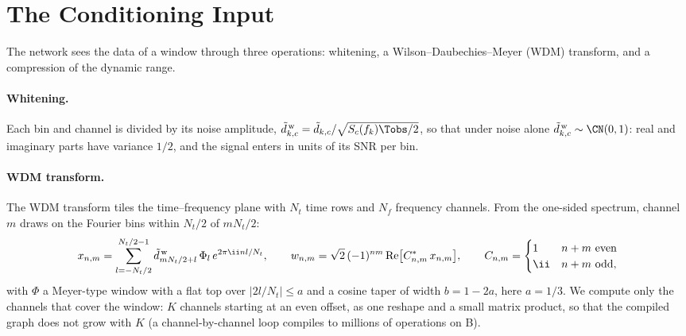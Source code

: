 \section{The Conditioning Input}
\label{app:conditioning}

The network sees the data of a window through three operations: whitening, a
Wilson--Daubechies--Meyer (WDM) transform, and a compression of the dynamic range.

\paragraph{Whitening.}
Each bin and channel is divided by its noise amplitude,
$\tilde d^{\,\rm w}_{k,c} = \tilde d_{k,c}/\sqrt{S_c(f_k)\Tobs/2}$, so that under noise alone
$\tilde d^{\,\rm w}_{k,c}\sim\CN(0,1)$: real and imaginary parts have variance $1/2$, and the
signal enters in units of its SNR per bin.

\paragraph{WDM transform.}
The WDM transform \citep{necula2012transient,cornish2020time,vajpeyi2026explicit} tiles the
time--frequency plane with $N_t$ time rows and $N_f$ frequency channels. From the one-sided
spectrum, channel $m$ draws on the Fourier bins within $N_t/2$ of $mN_t/2$:
\begin{equation}
  x_{n,m} = \sum_{l=-N_t/2}^{N_t/2-1}\tilde d^{\,\rm w}_{mN_t/2+l}\,\Phi_l\,e^{2\pi\ii nl/N_t},
  \qquad
  w_{n,m} = \sqrt2\,(-1)^{nm}\,\mathrm{Re}\bigl[C^*_{n,m}\,x_{n,m}\bigr],
  \qquad
  C_{n,m} = \begin{cases}1 & n+m\ \text{even}\\ \ii & n+m\ \text{odd},\end{cases}
  \label{eq:wdm}
\end{equation}
with $\Phi$ a Meyer-type window with a flat top over $|2l/N_t|\le a$ and a cosine taper of
width $b = 1-2a$, here $a = 1/3$. We compute only the channels that cover the window: $K$
channels starting at an even offset, as one reshape and a small matrix product, so that the
compiled graph does not grow with $K$ (a channel-by-channel loop compiles to millions of
operations on B).

